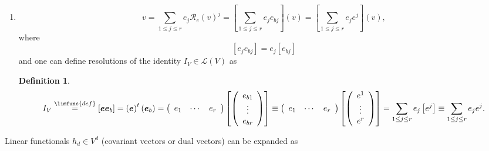 \documentclass[aps,preprint]{revtex4}
\newtheorem{definition}[theorem]{Definition}
\begin{document}
\begin{enumerate}
\begin{enumerate}
\item 
\begin{equation}
v=\sum_{1\leq j\leq r}e_{j}\mathcal{R}_{e}\left( v\right) ^{j}=\left[
\sum_{1\leq j\leq r}e_{j}e_{bj}\right] \left( v\right) =\left[ \sum_{1\leq
j\leq r}e_{j}e^{j}\right] \left( v\right) ,
\end{equation}%
where 
\begin{equation}
\left[ e_{j}e_{bj}\right] =e_{j}\left[ e_{bj}\right]
\end{equation}%
and one can define resolutions of the identity $I_{V}\in \mathcal{L}\left(
V\right) $ as

\begin{definition}
\begin{equation}
I_{V}\overset{\limfunc{def}}{=}\left[ \boldsymbol{ee}_{b}\right] =\left( 
\boldsymbol{e}\right) ^{t}\left( \boldsymbol{e}_{b}\right) =\left( 
\begin{array}{ccc}
e_{1} & \cdots & e_{r}%
\end{array}%
\right) \left[ \left( 
\begin{array}{c}
e_{b1} \\ 
\vdots \\ 
e_{br}%
\end{array}%
\right) \right] \equiv \left( 
\begin{array}{ccc}
e_{1} & \cdots & e_{r}%
\end{array}%
\right) \left[ \left( 
\begin{array}{c}
e^{1} \\ 
\vdots \\ 
e^{r}%
\end{array}%
\right) \right] =\sum_{1\leq j\leq r}e_{j}\left[ e^{j}\right] \equiv
\sum_{1\leq j\leq r}e_{j}e^{j}.
\end{equation}
\end{definition}
\end{enumerate}

Linear functionals $h_{d}\in V^{d}$ (covariant vectors or dual vectors) can
be expanded as


\end{enumerate}
\end{document}
